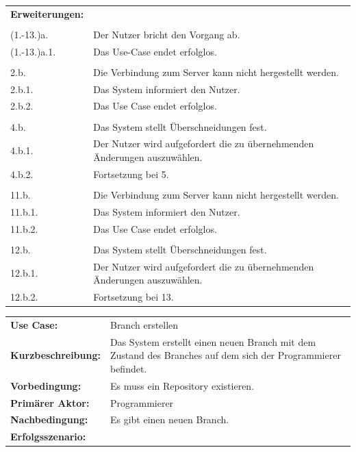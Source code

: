 \documentclass[a4paper]{article}
\begin{document}
\begin{tabularx}{\textwidth}{lX}
\textbf{Erweiterungen:}\\\\
\qquad \qquad (1.-13.)a. & Der Nutzer bricht den Vorgang ab.\\
\qquad \qquad (1.-13.)a.1. & Das Use-Case endet erfolglos.\\
\\
\qquad \qquad 2.b. & Die Verbindung zum Server kann nicht hergestellt werden. \\
\qquad \qquad 2.b.1. & Das System informiert den Nutzer. \\
\qquad \qquad 2.b.2. & Das Use Case endet erfolglos. \\

\\
\qquad \qquad 4.b. & Das System stellt Überschneidungen fest.\\
\qquad \qquad 4.b.1. & Der Nutzer wird aufgefordert die zu übernehmenden Änderungen auszuwählen.\\
\qquad \qquad 4.b.2. & Fortsetzung bei 5.\\
\\
\qquad \qquad 11.b. & Die Verbindung zum Server kann nicht hergestellt werden.\\
\qquad \qquad 11.b.1. & Das System informiert den Nutzer. \\
\qquad \qquad 11.b.2. & Das Use Case endet erfolglos. \\
\\
\qquad \qquad 12.b. & Das System stellt Überschneidungen fest.\\
\qquad \qquad 12.b.1. & Der Nutzer wird aufgefordert die zu übernehmenden Änderungen auszuwählen.\\
\qquad \qquad 12.b.2. & Fortsetzung bei 13.\\
\end{tabularx}

\newpage

\begin{tabularx}{\textwidth}{lX}
\\
\textbf{Use Case:} & Branch erstellen\\
\textbf{Kurzbeschreibung:} & Das System erstellt einen neuen Branch mit dem Zustand des Branches auf dem sich der Programmierer befindet.\\
\textbf{Vorbedingung:} & Es muss ein Repository existieren.\\
\textbf{Primärer Aktor:} & Programmierer\\
\textbf{Nachbedingung:}	& Es gibt einen neuen Branch.\\
\textbf{Erfolgsszenario:} & 
\end{tabularx}
\end{document}
